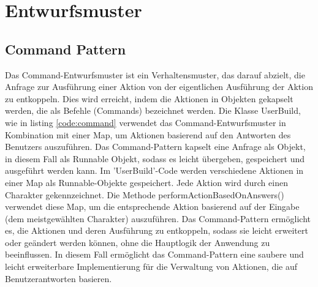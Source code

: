 \chapter{Entwurfsmuster}
\section{Command Pattern}

Das Command-Entwurfsmuster ist ein Verhaltensmuster, das darauf abzielt, die Anfrage zur Ausführung einer Aktion von der eigentlichen Ausführung der Aktion zu entkoppeln. Dies wird erreicht, indem die Aktionen in Objekten gekapselt werden, die als Befehle (Commands) bezeichnet werden. Die Klasse UserBuild, wie in listing \ref{code:command} verwendet das Command-Entwurfsmuster in Kombination mit einer Map, um Aktionen basierend auf den Antworten des Benutzers auszuführen. Das Command-Pattern kapselt eine Anfrage als Objekt, in diesem Fall als Runnable Objekt, sodass es leicht übergeben, gespeichert und ausgeführt werden kann. Im 'UserBuild'-Code werden verschiedene Aktionen in einer Map als Runnable-Objekte gespeichert. Jede Aktion wird durch einen Charakter gekennzeichnet. Die Methode performActionBasedOnAnswers() verwendet diese Map, um die entsprechende Aktion basierend auf der Eingabe (dem meistgewählten Charakter) auszuführen. Das Command-Pattern ermöglicht es, die Aktionen und deren Ausführung zu entkoppeln, sodass sie leicht erweitert oder geändert werden können, ohne die Hauptlogik der Anwendung zu beeinflussen. In diesem Fall ermöglicht das Command-Pattern eine saubere und leicht erweiterbare Implementierung für die Verwaltung von Aktionen, die auf Benutzerantworten basieren.
\newpage


